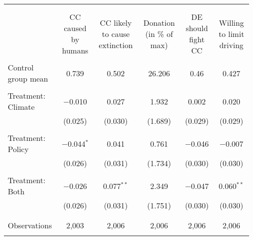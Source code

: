 
\begin{tabular}{@{\extracolsep{5pt}}lccccc} 
\\[-1.8ex]\hline 
\hline \\[-1.8ex] 
\\[-1.8ex] & CC caused by humans & CC likely to cause extinction & Donation (in \% of max) & DE should fight CC & Willing to limit driving \\ 
\hline \\[-1.8ex] 
 Control group mean & 0.739 & 0.502 & 26.206 & 0.46 & 0.427  \\ \hline \\[-1.8ex] Treatment: Climate & $-$0.010 & 0.027 & 1.932 & 0.002 & 0.020 \\ 
  & (0.025) & (0.030) & (1.689) & (0.029) & (0.029) \\ 
  & & & & & \\ 
 Treatment: Policy & $-$0.044$^{*}$ & 0.041 & 0.761 & $-$0.046 & $-$0.007 \\ 
  & (0.026) & (0.031) & (1.734) & (0.030) & (0.030) \\ 
  & & & & & \\ 
 Treatment: Both & $-$0.026 & 0.077$^{**}$ & 2.349 & $-$0.047 & 0.060$^{**}$ \\ 
  & (0.026) & (0.031) & (1.751) & (0.030) & (0.030) \\ 
  & & & & & \\ 
\hline \\[-1.8ex] 

Observations & 2,003 & 2,006 & 2,006 & 2,006 & 2,006 \\ 
\hline 
\hline \\[-1.8ex] 
\end{tabular} 